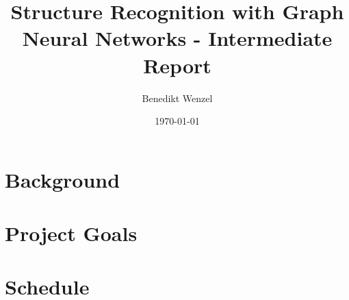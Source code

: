 \documentclass[12pt]{article}
\title{Structure Recognition with Graph Neural Networks - Intermediate Report}
\author{Benedikt Wenzel}
\date{\today}
\begin{document}
\maketitle

\begin{abstract}

\end{abstract}

\section{Background}


\section{Project Goals}


\section{Schedule}

\end{document}
